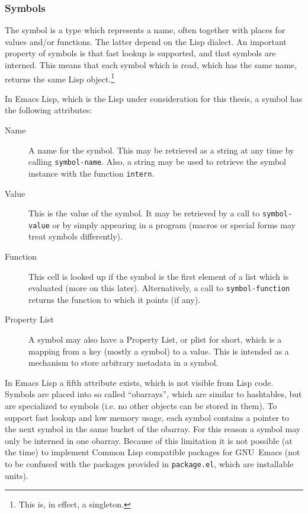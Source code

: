 \documentclass[a4paper,10pt,twoside]{report}
\newcommand{\el}{Emacs Lisp}
\newcommand{\cl}{Common Lisp}
\newcommand{\fun}[1]{\texttt{#1}}
\newcommand{\emacs}{GNU~Emacs}
\begin{document}
\subsubsection{Symbols}
\label{subsubsec:symbols}

The symbol is a type which represents a name, often together with places for
values and/or functions.  The latter depend on the Lisp dialect.  An important
property of symbols is that fast lookup is supported, and that symbols are
interned.  This means that each symbol which is read, which has the same name,
returns the same Lisp object.\footnote{This is, in effect, a singleton.}

In \el{}, which is the Lisp under consideration for this thesis, a symbol has
the following attributes:

\begin{description}
\item[{Name}] A name for the symbol.  This may be retrieved as a string at any
  time by calling \fun{symbol-name}.  Also, a string may be used to retrieve the
  symbol instance with the function \fun{intern}.
\item[{Value}] This is the value of the symbol.  It may be retrieved by a call
  to \fun{symbol-value} or by simply appearing in a program (macros or special
  forms may treat symbols differently).
\item[{Function}] This cell is looked up if the symbol is the first element of a
  list which is evaluated (more on this later).  Alternatively, a call to
  \fun{symbol-function} returns the function to which it points (if any).
\item[{Property List}] A symbol may also have a Property List, or plist for
  short, which is a mapping from a key (mostly a symbol) to a value.  This is
  intended as a mechanism to store arbitrary metadata in a symbol.
\end{description}

In \el{} a fifth attribute exists, which is not visible from Lisp code.  Symbols
are placed into so called ``obarrays'', which are similar to hashtables, but are
specialized to symbols (i.e. no other objects can be stored in them).  To
support fast lookup and low memory usage, each symbol contains a pointer to the
next symbol in the same bucket of the obarray.  For this reason a symbol may
only be interned in one obarray.\cite[Section 8.3 ``Creating and Interning
Symbols'']{elisp-reference} Because of this limitation it is not possible (at
the time) to implement \cl{} compatible packages for \emacs{} (not to be
confused with the packages provided in \fun{package.el}, which are installable
units).
\end{document}
